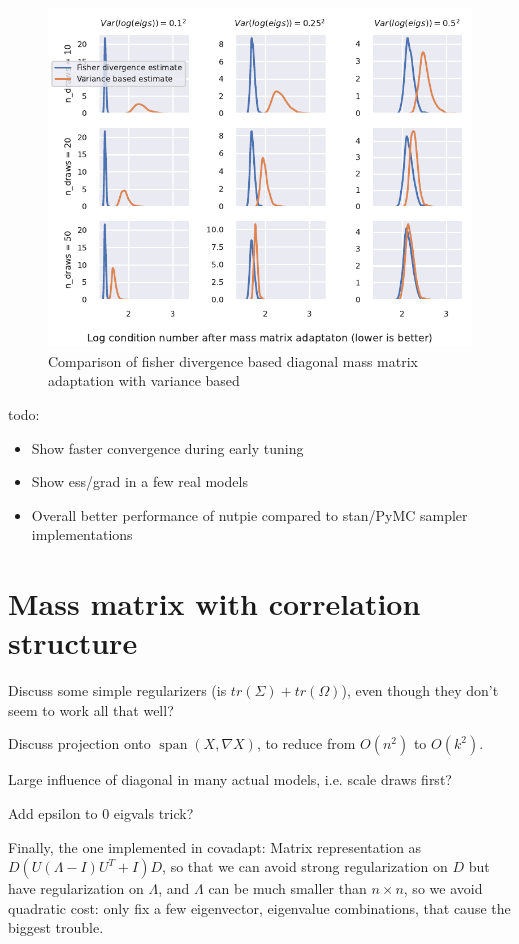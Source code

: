 \documentclass{scrartcl}
\DeclareMathOperator{\vecSpan}{span}
\begin{document}
\begin{figure}
\includegraphics{figures/diag_condition_number}
\caption {Comparison of fisher divergence based diagonal mass matrix adaptation with variance based}
\label{fig_diag_condition}
\end{figure}

todo:
\begin{itemize}
\item Show faster convergence during early tuning
\item Show ess/grad in a few real models
\item Overall better performance of nutpie compared to stan/PyMC sampler
implementations
\end{itemize}

\section{Mass matrix with correlation structure}

Discuss some simple regularizers (is $tr(\Sigma) + tr(\Omega)$), even though
they don't seem to work all that well?

Discuss projection onto $\vecSpan(X, \nabla X)$, to reduce from $O(n^2)$ to $O(k^2)$.

Large influence of diagonal in many actual models, i.e. scale draws first?

Add epsilon to 0 eigvals trick?

Finally, the one implemented in covadapt: Matrix representation as $D(U(\Lambda
- I)U^T + I)D$, so that we can avoid strong regularization on $D$ but have
regularization on $\Lambda$, and $\Lambda$ can be much smaller than $n\times
n$, so we avoid quadratic cost: only fix a few eigenvector, eigenvalue
combinations, that cause the biggest trouble.
\end{document}
